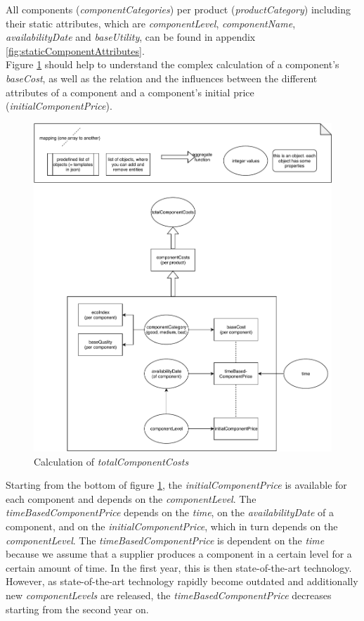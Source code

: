 All components (\textit{componentCategories}) per product (\textit{productCategory}) including their static attributes, which are \textit{componentLevel}, \textit{componentName}, \textit{availabilityDate} and \textit{baseUtility}, can be found in appendix \ref{fig:staticComponentAttributes}.\\
Figure \ref{img:totalComponentCosts} should help to understand the complex calculation of a component's \textit{baseCost}, as well as the relation and the influences between the different attributes of a component and a component’s initial price (\textit{initialComponentPrice}).
\begin{figure} [H]
	\centering
	\includegraphics[width=11.5cm]{images/totalComponentCosts.pdf}
	\caption{Calculation of \textit{totalComponentCosts}}
	\label{img:totalComponentCosts}
\end{figure}

Starting from the bottom of figure \ref{img:totalComponentCosts}, the \textit{initialComponentPrice} is available for each component and depends on the \textit{componentLevel}.
The \textit{timeBasedComponentPrice} depends on the \textit{time}, on the \textit{availabilityDate} of a component, and on the \textit{initialComponentPrice}, which in turn depends on the \textit{componentLevel}.
The \textit{timeBasedComponentPrice} is dependent on the \textit{time} because we assume that a supplier produces a component in a certain level for a certain amount of time. In the first year, this is then state-of-the-art technology. However, as state-of-the-art technology rapidly become outdated and additionally new \textit{componentLevels} are released, the \textit{timeBasedComponentPrice} decreases starting from the second year on.

